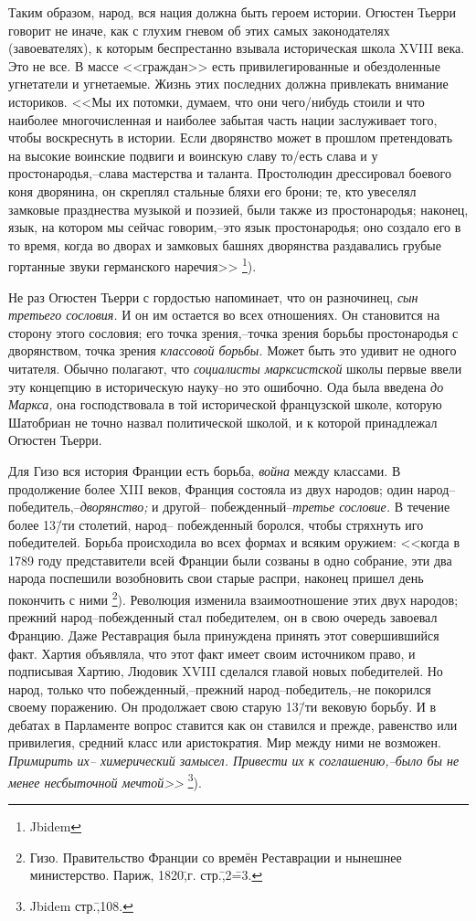 Таким образом, народ, вся нация должна быть героем истории. Огюстен Тьерри говорит не иначе, как с глухим гневом об этих самых законодателях (завоевателях), к которым беспрестанно взывала историческая школа XVIII века. Это не все. В массе <<граждан>> есть привилегированные и обездоленные угнетатели и угнетаемые. Жизнь этих последних должна привлекать внимание историков. <<Мы их потомки, думаем, что они чего\-/нибудь стоили и что наиболее многочисленная и наиболее забытая часть нации заслуживает того, чтобы воскреснуть в истории. Если дворянство может в прошлом претендовать на высокие воинские подвиги и воинскую славу то\-/есть слава и у простонародья,\---слава мастерства и таланта. Простолюдин дрессировал боевого коня дворянина, он скреплял стальные бляхи его брони; те, кто увеселял замковые празднества музыкой и поэзией, были также из простонародья; наконец, язык, на котором мы сейчас говорим,\---это язык простонародья; оно создало его в то время, когда во дворах и замковых башнях дворянства раздавались грубые гортанные звуки германского наречия>> \footnote{Jbidem}).

Не раз Огюстен Тьерри с гордостью напоминает, что он разночинец, \emph{сын третьего сословия.} И он им остается во всех отношениях. Он становится на сторону этого сословия; его точка зрения,\---точка зрения борьбы простонародья с дворянством, точка зрения \emph{классовой борьбы.} Может быть это удивит не одного читателя. Обычно полагают, что \emph{социалисты марксистской} школы первые ввели эту концепцию в историческую науку\---но это ошибочно. Ода была введена \emph{до Маркса,} она господствовала в той исторической французской школе, которую Шатобриан не точно назвал политической школой, и к которой принадлежал Огюстен Тьерри.

Для Гизо вся история Франции есть борьба, \emph{война} между классами. В продолжение более XIII веков, Франция состояла из двух народов; один народ\---победитель,\---\emph{дворянство;} и другой\--- побежденный\---\emph{третье сословие.} В течение более 13\=/ти столетий, народ\--- побежденный боролся, чтобы стряхнуть иго победителей. Борьба происходила во всех формах и всяким оружием: <<когда в 1789 году представители всей Франции были созваны в одно собрание, эти два народа поспешили возобновить свои старые распри, наконец пришел день покончить с ними \footnote{Гизо. Правительство Франции со времён Реставрации и нынешнее министерство. Париж, 1820\=,г. стр.\=,2\==3.}). Революция изменила взаимоотношение этих двух народов; прежний народ\---побежденный стал победителем, он в свою очередь завоевал Францию. Даже Реставрация была принуждена принять этот совершившийся факт. Хартия объявляла, что этот факт имеет своим источником право, и подписывая Хартию, Людовик XVIII сделался главой новых победителей. Но народ, только что побежденный,\---прежний народ\---победитель,\---не покорился своему поражению. Он продолжает свою старую 13\=/ти вековую борьбу. И в дебатах в Парламенте вопрос ставится как он ставился и прежде, равенство или привилегия, средний класс или аристократия. Мир между ними не возможен. \emph{Примирить их\--- химерический замысел. Привести их к соглашению,\---было бы не менее несбыточной мечтой>>} \footnote{Jbidem стр.\=,108.}).

